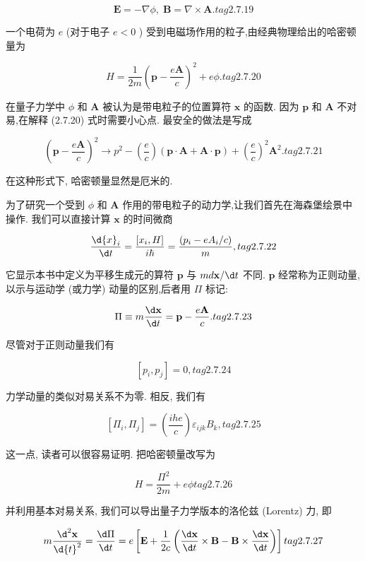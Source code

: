 \documentclass[lang=cn,newtx,10pt,scheme=chinese,thmcnt=section]{elegantbook}
\begin{document}
$$
\mathbf{E} = - \nabla \phi ,\;\mathbf{B} = \nabla \times \mathbf{A}. tag{2. 7.19}
$$

一个电荷为 $e$ (对于电子 $e < 0$ ) 受到电磁场作用的粒子,由经典物理给出的哈密顿量为

$$
H = \frac{1}{2m}{\left( \mathbf{p} - \frac{e\mathbf{A}}{c}\right) }^{2} + {e\phi }. tag{2. 7.20}
$$

在量子力学中 $\phi$ 和 $\mathbf{A}$ 被认为是带电粒子的位置算符 $\mathbf{x}$ 的函数. 因为 $\mathbf{p}$ 和 $\mathbf{A}$ 不对易,在解释 (2.7.20) 式时需要小心点. 最安全的做法是写成

$$
{\left( \mathbf{p} - \frac{e\mathbf{A}}{c}\right) }^{2} \rightarrow {p}^{2} - \left( \frac{e}{c}\right) \left( {\mathbf{p} \cdot \mathbf{A} + \mathbf{A} \cdot \mathbf{p}}\right) + {\left( \frac{e}{c}\right) }^{2}{\mathbf{A}}^{2}. tag{2. 7.21}
$$

在这种形式下, 哈密顿量显然是厄米的.

为了研究一个受到 $\phi$ 和 $\mathbf{A}$ 作用的带电粒子的动力学,让我们首先在海森堡绘景中操作. 我们可以直接计算 $\mathbf{x}$ 的时间微商

$$
\frac{\d {x}_{i}}{\d t} = \frac{\left\lbrack {x}_{i}, H\right\rbrack }{i\hbar } = \frac{\left( {p}_{i} - e{A}_{i}/c\right) }{m}, tag{2.7.22}
$$

它显示本书中定义为平移生成元的算符 $\mathbf{p}$ 与 ${md}\mathbf{x}/{\d t}$ 不同. $\mathbf{p}$ 经常称为正则动量,以示与运动学 (或力学) 动量的区别,后者用 $\Pi$ 标记:

$$
\Pi \equiv m\frac{\d \mathbf{x}}{\d t} = \mathbf{p} - \frac{e\mathbf{A}}{c}. tag{2.7.23}
$$

尽管对于正则动量我们有

$$
\left\lbrack {{p}_{i},{p}_{j}}\right\rbrack = 0, tag{2. 7.24}
$$

力学动量的类似对易关系不为零. 相反, 我们有

$$
\left\lbrack {{\Pi }_{i},{\Pi }_{j}}\right\rbrack = \left( \frac{ihe}{c}\right) {\varepsilon }_{ijk}{B}_{k}, tag{2.7.25}
$$

这一点, 读者可以很容易证明. 把哈密顿量改写为

$$
H = \frac{{\Pi }^{2}}{2m} + {e\phi } tag{2. 7.26}
$$


并利用基本对易关系, 我们可以导出量子力学版本的洛伦兹 (Lorentz) 力, 即

$$
m\frac{{\d}^{2}\mathbf{x}}{\d{t}^{2}} = \frac{\d \Pi }{\d t} = e\left\lbrack {\mathbf{E} + \frac{1}{2c}\left( {\frac{\d \mathbf{x}}{\d t} \times \mathbf{B} - \mathbf{B} \times \frac{\d \mathbf{x}}{\d t}}\right) }\right\rbrack tag{2.7.27}
$$
\end{document}
